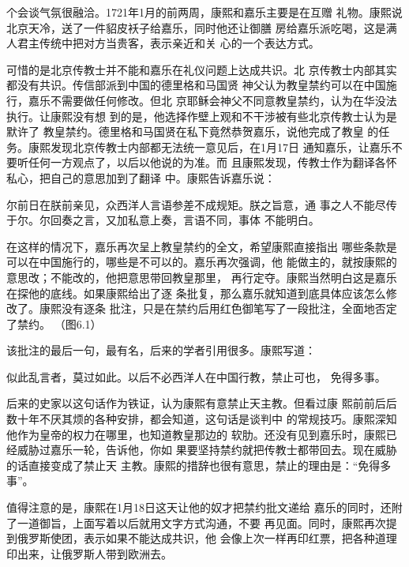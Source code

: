 个会谈气氛很融洽。1721年1月的前两周，康熙和嘉乐主要是在互赠%
礼物。康熙说北京天冷，送了一件貂皮袄子给嘉乐，同时他还让御膳%
房给嘉乐派吃喝，这是满人君主传统中把对方当贵客，表示亲近和关%
心的一个表达方式。%
\par
可惜的是北京传教士并不能和嘉乐在礼仪问题上达成共识。北%
京传教士内部其实都没有共识。传信部派到中国的德里格和马国贤%
神父认为教皇禁约可以在中国施行，嘉乐不需要做任何修改。但北%
京耶稣会神父不同意教皇禁约，认为在华没法执行。让康熙没有想%
到的是，他选择作壁上观和不干涉被有些北京传教士认为是默许了%
教皇禁约。德里格和马国贤在私下竟然恭贺嘉乐，说他完成了教皇%
的任务。康熙发现北京传教士内部都无法统一意见后，在1月17日%
通知嘉乐，让嘉乐不要听任何一方观点了，以后以他说的为准。而%
且康熙发现，传教士作为翻译各怀私心，把自己的意思加到了翻译%
中。康熙告诉嘉乐说：%
\par
{\bookkai 尔前日在朕前亲见，众西洋人言语参差不成规矩。朕之旨意，通}%
{\bookkai 事之人不能尽传于尔。尔回奏之言，又加私意上奏，言语不同，事体}%
{\bookkai 不能明白。}%
\par
在这样的情况下，嘉乐再次呈上教皇禁约的全文，希望康熙直接指出%
哪些条款是可以在中国施行的，哪些是不可以的。嘉乐再次强调，他%
能做主的，就按康熙的意思改；不能改的，他把意思带回教皇那里，%
再行定夺。康熙当然明白这是嘉乐在探他的底线。如果康熙给出了逐%
条批复，那么嘉乐就知道到底具体应该怎么修改了。康熙没有逐条%
批注，只是在禁约后用红色御笔写了一段批注，全面地否定了禁约。%
（图6.1）%
\par
该批注的最后一句，最有名，后来的学者引用很多。康熙写道：%
\par
{\bookkai 似此乱言者，莫过如此。以后不必西洋人在中国行教，禁止可也，}%
{\bookkai 免得多事。}%
\par
后来的史家以这句话作为铁证，认为康熙有意禁止天主教。但看过康%
熙前前后后数十年不厌其烦的各种安排，都会知道，这句话是谈判中%
的常规技巧。康熙深知他作为皇帝的权力在哪里，也知道教皇那边的%
软肋。还没有见到嘉乐时，康熙已经威胁过嘉乐一轮，告诉他，你如%
果要坚持禁约就把传教士都带回去。现在威胁的话直接变成了禁止天%
主教。康熙的措辞也很有意思，禁止的理由是：“免得多事”。%
\par
值得注意的是，康熙在1月18日这天让他的奴才把禁约批文递给%
嘉乐的同时，还附了一道御旨，上面写着以后就用文字方式沟通，不要%
再见面。同时，康熙再次提到俄罗斯使团，表示如果不能达成共识，他%
会像上次一样再印红票，把各种道理印出来，让俄罗斯人带到欧洲去。%
